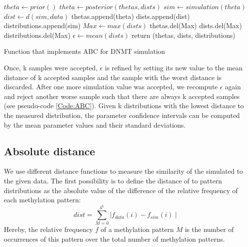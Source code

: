 \begin{algorithm}
\begin{algorithmic}
 
		\State $theta \gets prior()$
	\Else
		\State $theta \gets posterior(thetas, dists)$
	\EndIf
	\State $sim \gets simulation(theta)$
	\State $dist \gets d(sim, data)$
		\State thetas.append(theta)
		\State dists.append(dist)
		\State distributions.append(sim)
			\State $Max \gets max(dists)$
			\State thetas.del(Max)
			\State dists.del(Max)
			\State distributions.del(Max)
			\State $\epsilon \gets mean(dists)$
		\EndIf
	\EndIf
\EndFor
\State return (thetas, dists, distributions)
\EndProcedure
\end{algorithmic}
\caption{\label{Code:ABC} Function that implements ABC for DNMT simulation}
\end{algorithm}

Once, k samples were accepted, $\epsilon$ is refined by setting its new value to the mean distance of k accepted samples and the sample with the worst distance is discarded. After one more simulation value was accepted, we recompute $\epsilon$ again and reject another worse sample such that there are always k accepted samples (see pseudo-code \ref{Code:ABC}). Given k distributions with the lowest distance to the measured distribution, the parameter confidence intervals can be computed by the mean parameter values and their standard deviations.

\subsection{Absolute distance}
\label{abs}
We use different distance functions to measure the similarity of the simulated to the given data. The first possibility is to define the distance of to pattern distributions as the absolute value of the difference of the relative frequency of each  methylation pattern:
\[dist = \sum^{4^L}_{M=0}{\mid f_{data}(i) - f_{sim}(i) \mid}\]
Hereby, the relative frequency $f$ of a methylation pattern $M$ is the number of occurrences of this pattern over the total number of methylation patterns.

